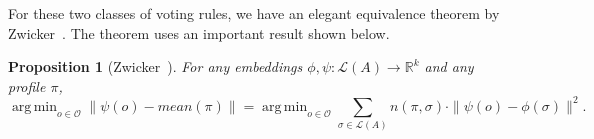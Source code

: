 \documentclass[10pt,letterpaper]{article}
\newcommand{\calL}{{\mathcal{L}}}
\newcommand{\rank}{{\calL(A)}}
\newcommand{\calO}{{\mathcal{O}}}
\DeclareMathOperator*{\argmin}{arg\,min}
\newtheorem{proposition}{Proposition}
\begin{document}


For these two classes of voting rules, we have an elegant equivalence theorem by Zwicker~\cite{Zwicker08a}. The theorem uses an important result shown below.

\begin{proposition}[Zwicker~\cite{Zwicker08a}]
For any embeddings $\phi,\psi : \rank \rightarrow \mathbb{R}^k$ and any profile $\pi$,
$$
\argmin_{o \in \calO} \|\psi(o)-mean(\pi)\| = \argmin_{o \in \calO} \sum_{\sigma \in \rank} n(\pi,\sigma) \cdot \|\psi(o)-\phi(\sigma)\|^2.
$$ 
\label{prop:MPR-GSR-conversion}
\end{proposition}
\end{document}
